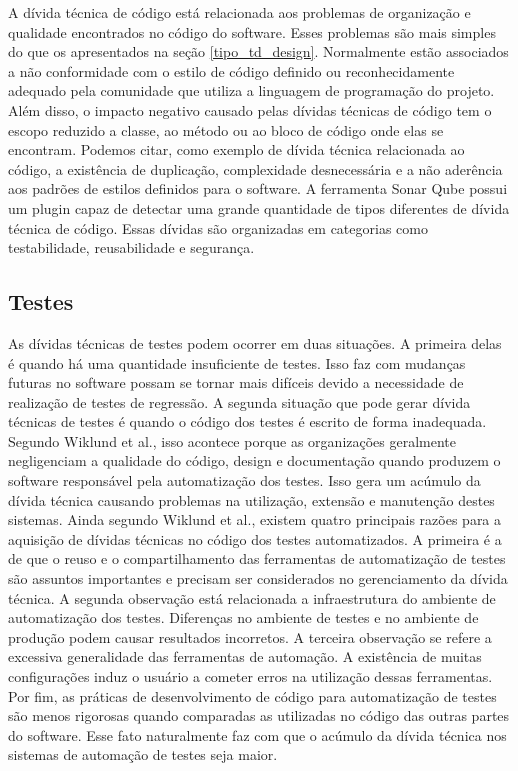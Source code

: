 A dívida técnica de código está relacionada aos problemas  de organização e qualidade encontrados no código do software. Esses problemas são mais simples do que os apresentados na seção \ref{tipo_td_design}. Normalmente estão associados a não conformidade com o estilo de código definido ou reconhecidamente adequado pela comunidade que utiliza a linguagem de programação do projeto. Além disso, o impacto negativo causado pelas dívidas técnicas de código tem o escopo reduzido a classe, ao método ou ao bloco de código onde elas se encontram.  Podemos citar, como exemplo de dívida técnica relacionada ao código, a existência de duplicação, complexidade desnecessária e a não aderência aos padrões de estilos definidos para o software. A ferramenta Sonar Qube \cite{campbell2013sonarqube} possui um plugin capaz de detectar uma grande quantidade de tipos diferentes de dívida técnica de código. Essas dívidas são organizadas em categorias como testabilidade, reusabilidade e segurança. 


\subsection{Testes}


As dívidas técnicas de testes podem ocorrer em duas situações. A primeira delas é quando há uma quantidade insuficiente de testes. Isso faz com mudanças futuras no software possam se tornar mais difíceis devido a necessidade de realização de testes de regressão. A segunda situação que pode gerar dívida técnicas de testes é quando o código dos testes é escrito de forma inadequada. Segundo Wiklund et al.\cite{wiklund2012technical}, isso acontece porque as organizações geralmente negligenciam a qualidade do código, design e documentação quando produzem o software responsável pela automatização dos testes. Isso gera um acúmulo da dívida técnica causando problemas na utilização, extensão e manutenção destes sistemas.  Ainda segundo  Wiklund et al., existem quatro principais razões para a aquisição de dívidas técnicas no código dos testes automatizados. A primeira é a de que o reuso e o compartilhamento das ferramentas de automatização de testes são assuntos importantes e precisam ser considerados no gerenciamento da dívida técnica. A segunda observação está relacionada a infraestrutura do ambiente de automatização dos testes. Diferenças no ambiente de testes e no ambiente de produção podem causar resultados incorretos. A terceira observação se refere a excessiva generalidade das ferramentas de automação. A existência de muitas configurações induz o usuário a cometer erros na utilização dessas ferramentas. Por fim, as práticas de desenvolvimento de código para automatização de testes são menos rigorosas quando comparadas as utilizadas no código das outras partes do software. Esse fato naturalmente faz com que o acúmulo da dívida técnica nos sistemas de automação de testes seja maior. 

